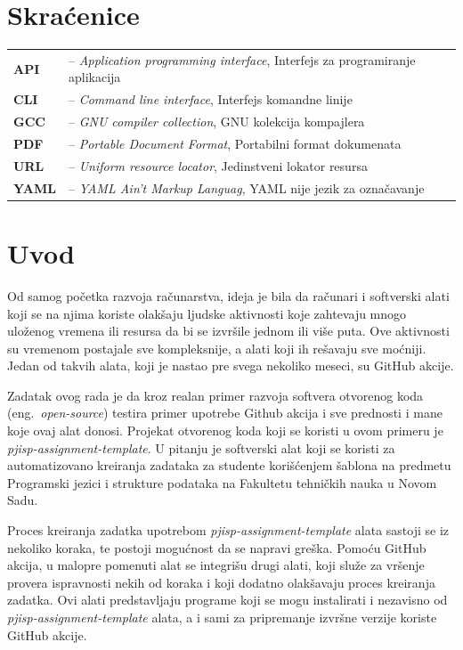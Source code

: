 \documentclass[12pt]{report}
\renewcommand{\chaptermark}[1]{\markboth{#1}{}}
\newcommand\frontmatter{
    \cleardoublepage{}
    \pagenumbering{Roman}
    \setlength{\parskip}{0pt}
}
\newcommand\mainmatter{
    \cleardoublepage{}
    \pagenumbering{arabic}
    \setlength{\parskip}{2mm}
    \titleformat{\chapter}{\normalfont\Large\bf\sffamily\raggedleft}{\thechapter.}{12pt}{}
}
\begin{document}
\frontmatter{}

\renewcommand{\MakeUppercase}[1]{#1}
\tableofcontents

\listoffigures

\chapter*{Skraćenice}
\chaptermark{Skraćenice}
\begin{tabular}{ l l }
    \textbf{API} & -- \textit{Application programming interface}, Interfejs za programiranje aplikacija \\
    \textbf{CLI} & -- \textit{Command line interface}, Interfejs komandne linije \\
    \textbf{GCC} & -- \textit{GNU compiler collection}, GNU kolekcija kompajlera \\
    \textbf{PDF} & -- \textit{Portable Document Format}, Portabilni format dokumenata \\
    \textbf{URL} & -- \textit{Uniform resource locator}, Jedinstveni lokator resursa \\
    \textbf{YAML} & -- \textit{YAML Ain't Markup Languag}, YAML nije jezik za označavanje \\
\end{tabular}

\mainmatter{}
\chapter{Uvod}
Od samog početka razvoja računarstva, ideja je bila da računari i softverski alati koji se na njima koriste olakšaju ljudske aktivnosti koje zahtevaju mnogo uloženog vremena ili resursa da bi se izvršile jednom ili više puta. Ove aktivnosti su vremenom postajale sve kompleksnije, a alati koji ih rešavaju sve moćniji. Jedan od takvih alata, koji je nastao pre svega nekoliko meseci, su GitHub akcije.

Zadatak ovog rada je da kroz realan primer razvoja softvera otvorenog koda (eng.\ \textit{open-source}) testira primer upotrebe Github akcija i sve prednosti i mane koje ovaj alat donosi. Projekat otvorenog koda koji se koristi u ovom primeru je \textit{pjisp-assignment-template}. U pitanju je softverski alat koji se koristi za automatizovano kreiranja zadataka za studente korišćenjem šablona na predmetu Programski jezici i strukture podataka na Fakultetu tehničkih nauka u Novom Sadu.

Proces kreiranja zadatka upotrebom \textit{pjisp-assignment-template} alata sastoji se iz nekoliko koraka, te postoji mogućnost da se napravi greška. Pomoću GitHub akcija, u malopre pomenuti alat se integrišu drugi alati, koji služe za vršenje provera ispravnosti nekih od koraka i koji dodatno olakšavaju proces kreiranja zadatka. Ovi alati predstavljaju programe koji se mogu instalirati i nezavisno od \textit{pjisp-assignment-template} alata, a i sami za pripremanje izvršne verzije koriste GitHub akcije.
\end{document}
